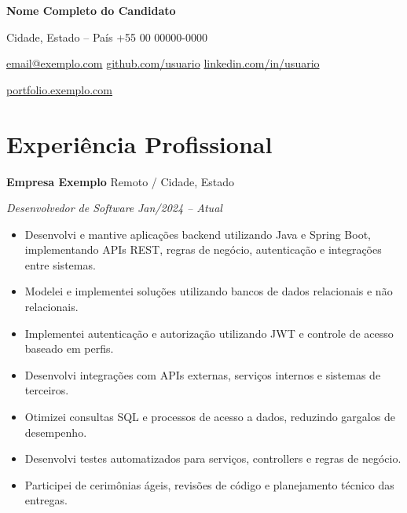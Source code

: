 \documentclass[a4paper,10pt]{article}
\begin{document}

\begin{center}

{\LARGE\textbf{Nome Completo do Candidato}}

\vspace{-0.15cm}

Cidade, Estado -- País
\quad\textbullet\quad
+55 00 00000-0000

\vspace{0.01cm}

\href{mailto:email@exemplo.com}{email@exemplo.com}
\quad\textbullet\quad
\href{https://github.com/usuario}{github.com/usuario}
\quad\textbullet\quad
\href{https://www.linkedin.com/in/usuario}{linkedin.com/in/usuario}

\vspace{0.03cm}

\href{https://portfolio.exemplo.com}
{portfolio.exemplo.com}

\end{center}

\vspace{-0.30cm}


\section{Experiência Profissional}

\textbf{Empresa Exemplo}
\hfill
Remoto / Cidade, Estado

\textit{Desenvolvedor de Software}
\hfill
\textit{Jan/2024 -- Atual}

\begin{itemize}

    \item Desenvolvi e mantive aplicações backend utilizando Java e Spring Boot, implementando APIs REST, regras de negócio, autenticação e integrações entre sistemas.

    \item Modelei e implementei soluções utilizando bancos de dados relacionais e não relacionais.

    \item Implementei autenticação e autorização utilizando JWT e controle de acesso baseado em perfis.

    \item Desenvolvi integrações com APIs externas, serviços internos e sistemas de terceiros.

    \item Otimizei consultas SQL e processos de acesso a dados, reduzindo gargalos de desempenho.

    \item Desenvolvi testes automatizados para serviços, controllers e regras de negócio.

    \item Participei de cerimônias ágeis, revisões de código e planejamento técnico das entregas.

\end{itemize}
\end{document}
